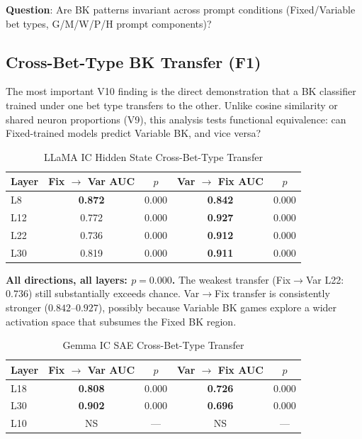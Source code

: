 \documentclass[11pt,a4paper]{article}
\begin{document}
\noindent\textbf{Question}: Are BK patterns invariant across prompt conditions (Fixed/Variable bet types, G/M/W/P/H prompt components)?

\subsection{Cross-Bet-Type BK Transfer (F1)}

The most important V10 finding is the direct demonstration that a BK classifier trained under one bet type transfers to the other. Unlike cosine similarity or shared neuron proportions (V9), this analysis tests functional equivalence: can Fixed-trained models predict Variable BK, and vice versa?

\begin{table}[H]
\centering
\caption{LLaMA IC Hidden State Cross-Bet-Type Transfer}\label{tab:t13}
\footnotesize
\begin{tabular}{lcccc}
\toprule
Layer & Fix $\rightarrow$ Var AUC & $p$ & Var $\rightarrow$ Fix AUC & $p$ \\
\midrule
L8 & \textbf{0.872} & 0.000 & \textbf{0.842} & 0.000 \\
L12 & 0.772 & 0.000 & \textbf{0.927} & 0.000 \\
L22 & 0.736 & 0.000 & \textbf{0.912} & 0.000 \\
L30 & 0.819 & 0.000 & \textbf{0.911} & 0.000 \\
\bottomrule
\end{tabular}
\end{table}

\noindent\textbf{All directions, all layers: $p=0.000$.} The weakest transfer (Fix$\rightarrow$Var L22: $0.736$) still substantially exceeds chance. Var$\rightarrow$Fix transfer is consistently stronger ($0.842$--$0.927$), possibly because Variable BK games explore a wider activation space that subsumes the Fixed BK region.

\begin{table}[H]
\centering
\caption{Gemma IC SAE Cross-Bet-Type Transfer}\label{tab:t14}
\footnotesize
\begin{tabular}{lcccc}
\toprule
Layer & Fix $\rightarrow$ Var AUC & $p$ & Var $\rightarrow$ Fix AUC & $p$ \\
\midrule
L18 & \textbf{0.808} & 0.000 & \textbf{0.726} & 0.000 \\
L30 & \textbf{0.902} & 0.000 & \textbf{0.696} & 0.000 \\
L10 & NS & --- & NS & --- \\
\bottomrule
\end{tabular}
\end{table}
\end{document}
